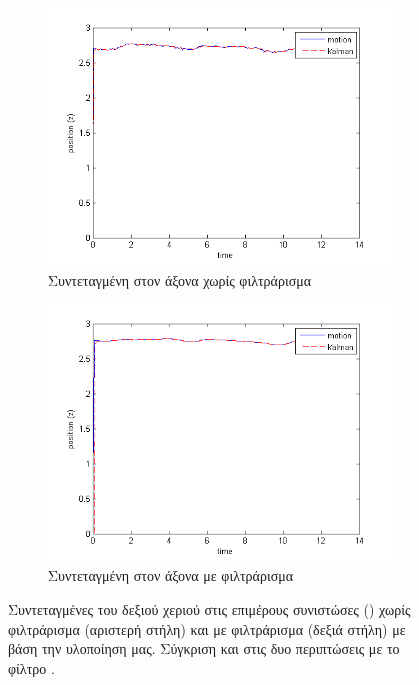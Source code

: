 \begin{figure}[H]
    \centering
    \begin{subfigure}[t]{.48\textwidth}
        \includegraphics[width=\textwidth, keepaspectratio]{fig/filter0-z.png}
        \caption{Συντεταγμένη στον  άξονα χωρίς φιλτράρισμα}
        \label{fig:filter0-z}
    \end{subfigure}
    \begin{subfigure}[t]{.48\textwidth}
        \includegraphics[width=\textwidth, keepaspectratio]{fig/filter3-z.png}
        \caption{Συντεταγμένη στον  άξονα με φιλτράρισμα}
        \label{fig:filter3-z}
    \end{subfigure}
    \caption{Συντεταγμένες του δεξιού χεριού στις επιμέρους συνιστώσες () χωρίς φιλτράρισμα (αριστερή στήλη) και με φιλτράρισμα (δεξιά στήλη) με βάση την υλοποίηση μας. Σύγκριση και στις δυο περιπτώσεις με το φίλτρο .}
    \label{fig:no-filter-filter-kalman}
\end{figure}


